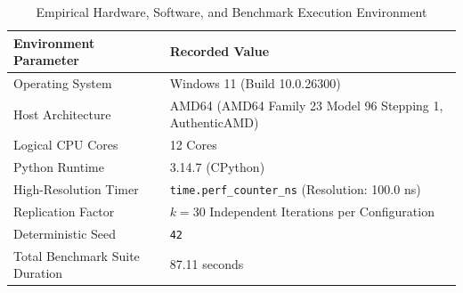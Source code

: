 \begin{table}[htbp]
\centering
\caption{Empirical Hardware, Software, and Benchmark Execution Environment}
\label{tab:environment_metadata}
\small
\begin{tabularx}{\textwidth}{l X}
\toprule
\textbf{Environment Parameter} & \textbf{Recorded Value} \\
\midrule
Operating System & Windows 11 (Build 10.0.26300) \\
Host Architecture & AMD64 (AMD64 Family 23 Model 96 Stepping 1, AuthenticAMD) \\
Logical CPU Cores & 12 Cores \\
Python Runtime & 3.14.7 (CPython) \\
High-Resolution Timer & \texttt{time.perf\_counter\_ns} (Resolution: 100.0 ns) \\
Replication Factor & $k = 30$ Independent Iterations per Configuration \\
Deterministic Seed & \texttt{42} \\
Total Benchmark Suite Duration & 87.11 seconds \\
\bottomrule
\end{tabularx}
\end{table}
